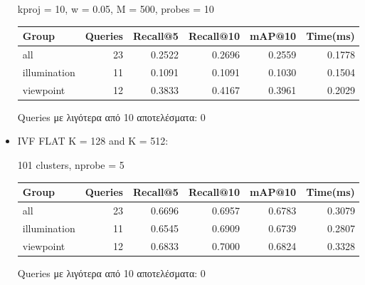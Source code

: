 \documentclass [conference]{IEEEtran}
\begin{document}
\begin{itemize}
    \begin{table}[H]
    \centering
    \small
    \setlength{\tabcolsep}{3pt}
    kproj = 10, w = 0.05, M = 500, probes = 10
    \par\smallskip
    \begin{tabular}{l r r r r r}
    \hline
    \textbf{Group} & \textbf{Queries} & \textbf{Recall@5} & \textbf{Recall@10} & \textbf{mAP@10} & \textbf{Time(ms)} \\
    \hline
    all & 23 & 0.2522 & 0.2696 & 0.2559 & 0.1778 \\
    illumination & 11 & 0.1091 & 0.1091 & 0.1030 & 0.1504 \\
    viewpoint & 12 & 0.3833 & 0.4167 & 0.3961 & 0.2029 \\
    \hline
    \end{tabular}
    \par\smallskip
    \footnotesize Queries με λιγότερα από 10 αποτελέσματα: 0
    \end{table}
     

    \item IVF FLAT K = 128 and K = 512:
    \begin{table}[H]
    \centering
    \small
    \setlength{\tabcolsep}{3pt}
    101 clusters, nprobe = 5
    \par\smallskip
    \begin{tabular}{l r r r r r}
    \hline
    \textbf{Group} & \textbf{Queries} & \textbf{Recall@5} & \textbf{Recall@10} & \textbf{mAP@10} & \textbf{Time(ms)} \\
    \hline
    all & 23 & 0.6696 & 0.6957 & 0.6783 & 0.3079 \\
    illumination & 11 & 0.6545 & 0.6909 & 0.6739 & 0.2807 \\
    viewpoint & 12 & 0.6833 & 0.7000 & 0.6824 & 0.3328 \\
    \hline
    \end{tabular}
    \par\smallskip
    \footnotesize Queries με λιγότερα από 10 αποτελέσματα: 0
    \end{table}
    


\end{itemize}
\end{document}
